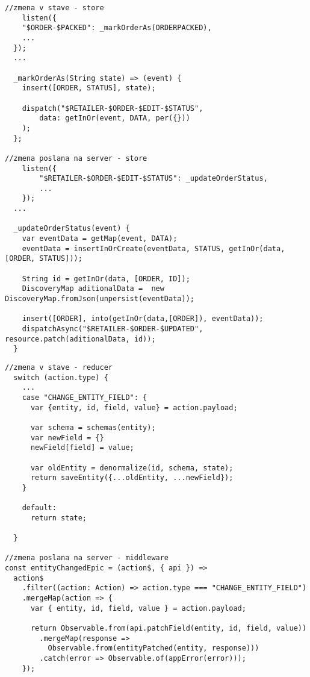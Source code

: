 
\begin{lstlisting}[caption=Dotaz na server vo Flux-e v store, label={lst:fetchDart}]
//zmena v stave - store
	listen({
    "$ORDER-$PACKED": _markOrderAs(ORDERPACKED),
    ...
  });
  ...

  _markOrderAs(String state) => (event) {
    insert([ORDER, STATUS], state);

    dispatch("$RETAILER-$ORDER-$EDIT-$STATUS",
        data: getInOr(event, DATA, per({}))
    );
  };

//zmena poslana na server - store
	listen({
		"$RETAILER-$ORDER-$EDIT-$STATUS": _updateOrderStatus,
		...
	});
  ...

  _updateOrderStatus(event) {
    var eventData = getMap(event, DATA);
    eventData = insertInOrCreate(eventData, STATUS, getInOr(data, [ORDER, STATUS]));

    String id = getInOr(data, [ORDER, ID]);
    DiscoveryMap aditionalData =  new DiscoveryMap.fromJson(unpersist(eventData));

    insert([ORDER], into(getInOr(data,[ORDER]), eventData));
    dispatchAsync("$RETAILER-$ORDER-$UPDATED", resource.patch(aditionalData, id));
  }
\end{lstlisting}

\bigskip

\begin{lstlisting}[caption=Dotaz na server v Redux-e cez middleware, label={lst:fetchJS}]
//zmena v stave - reducer
  switch (action.type) {
  	...
    case "CHANGE_ENTITY_FIELD": {
      var {entity, id, field, value} = action.payload;

      var schema = schemas(entity);
      var newField = {}
      newField[field] = value;

      var oldEntity = denormalize(id, schema, state);
      return saveEntity({...oldEntity, ...newField});
    }

    default:
      return state;

  }

//zmena poslana na server - middleware
const entityChangedEpic = (action$, { api }) =>
  action$
    .filter((action: Action) => action.type === "CHANGE_ENTITY_FIELD")
    .mergeMap(action => {
      var { entity, id, field, value } = action.payload;

      return Observable.from(api.patchField(entity, id, field, value))
        .mergeMap(response =>
          Observable.from(entityPatched(entity, response)))
        .catch(error => Observable.of(appError(error)));
    });
\end{lstlisting}